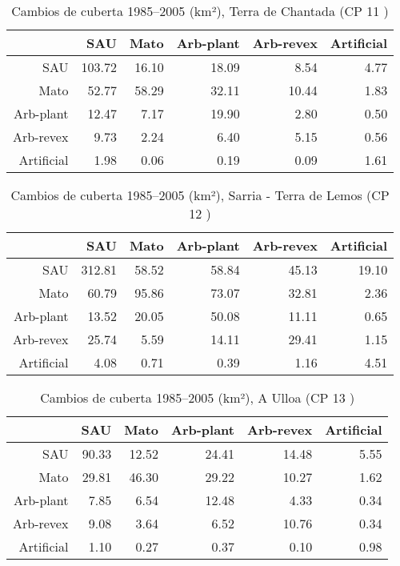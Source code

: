 \clearpage
\begin{table}[p]
\centering
\caption{Cambios de cuberta 1985--2005 (km²), Terra de Chantada (CP 11 )} 
\label{TaboaContinxCP11}
\begin{tabular}{rrrrrr}
  \hline
 & SAU & Mato & Arb-plant & Arb-revex & Artificial \\ 
  \hline
SAU & 103.72 & 16.10 & 18.09 & 8.54 & 4.77 \\ 
  Mato & 52.77 & 58.29 & 32.11 & 10.44 & 1.83 \\ 
  Arb-plant & 12.47 & 7.17 & 19.90 & 2.80 & 0.50 \\ 
  Arb-revex & 9.73 & 2.24 & 6.40 & 5.15 & 0.56 \\ 
  Artificial & 1.98 & 0.06 & 0.19 & 0.09 & 1.61 \\ 
   \hline
\end{tabular}
\end{table}
\begin{table}[p]
\centering
\caption{Cambios de cuberta 1985--2005 (km²), Sarria - Terra de Lemos (CP 12 )} 
\label{TaboaContinxCP12}
\begin{tabular}{rrrrrr}
  \hline
 & SAU & Mato & Arb-plant & Arb-revex & Artificial \\ 
  \hline
SAU & 312.81 & 58.52 & 58.84 & 45.13 & 19.10 \\ 
  Mato & 60.79 & 95.86 & 73.07 & 32.81 & 2.36 \\ 
  Arb-plant & 13.52 & 20.05 & 50.08 & 11.11 & 0.65 \\ 
  Arb-revex & 25.74 & 5.59 & 14.11 & 29.41 & 1.15 \\ 
  Artificial & 4.08 & 0.71 & 0.39 & 1.16 & 4.51 \\ 
   \hline
\end{tabular}
\end{table}
\begin{table}[p]
\centering
\caption{Cambios de cuberta 1985--2005 (km²), A Ulloa (CP 13 )} 
\label{TaboaContinxCP13}
\begin{tabular}{rrrrrr}
  \hline
 & SAU & Mato & Arb-plant & Arb-revex & Artificial \\ 
  \hline
SAU & 90.33 & 12.52 & 24.41 & 14.48 & 5.55 \\ 
  Mato & 29.81 & 46.30 & 29.22 & 10.27 & 1.62 \\ 
  Arb-plant & 7.85 & 6.54 & 12.48 & 4.33 & 0.34 \\ 
  Arb-revex & 9.08 & 3.64 & 6.52 & 10.76 & 0.34 \\ 
  Artificial & 1.10 & 0.27 & 0.37 & 0.10 & 0.98 \\ 
   \hline
\end{tabular}
\end{table}
